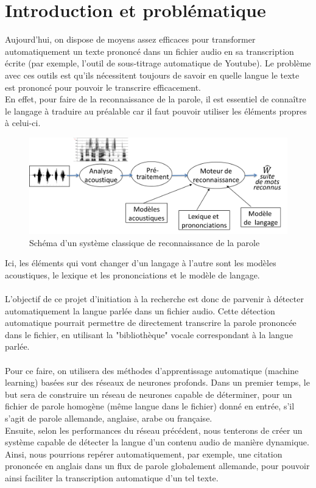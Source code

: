 \documentclass{article}
\begin{document}
\setcounter{page}{1}

\section{Introduction et problématique}

Aujourd'hui, on dispose de moyens assez efficaces pour transformer automatiquement un texte prononcé dans un fichier audio en sa transcription écrite (par exemple, l'outil de sous-titrage automatique de Youtube). Le problème avec ces outils est qu'ils nécessitent toujours de savoir en quelle langue le texte est prononcé pour pouvoir le transcrire efficacement.\\
En effet, pour faire de la reconnaissance de la parole, il est essentiel de connaître le langage à traduire au préalable car il faut pouvoir utiliser les éléments propres à celui-ci.\\

\begin{figure}[h]
  \centerline{\includegraphics[scale=0.6]{img/schema_reco.png}}
  \caption{Schéma d'un système classique de reconnaissance de la parole}
\end{figure}

\noindent Ici, les éléments qui vont changer d'un langage à l'autre sont les modèles acoustiques, le lexique et les prononciations et le modèle de langage.\\
 \\
L'objectif de ce projet d'initiation à la recherche est donc de parvenir à détecter automatiquement la langue parlée dans un fichier audio. Cette détection automatique pourrait permettre de directement transcrire la parole prononcée dans le fichier, en utilisant la "bibliothèque" vocale correspondant à la langue parlée.\\
 \\
Pour ce faire, on utilisera des méthodes d'apprentissage automatique (machine learning) basées sur des réseaux de neurones profonds.
Dans un premier temps, le but sera de construire un réseau de neurones capable de déterminer, pour un fichier de parole homogène (même langue dans le fichier) donné en entrée, s'il s'agit de parole  allemande, anglaise, arabe ou française.\\
Ensuite, selon les performances du réseau précédent, nous tenterons de créer un système capable de détecter la langue d'un contenu audio de manière dynamique. Ainsi, nous pourrions repérer automatiquement, par exemple, une citation prononcée en anglais dans un flux de parole globalement allemande, pour pouvoir ainsi faciliter la transcription automatique d'un tel texte.
\end{document}
